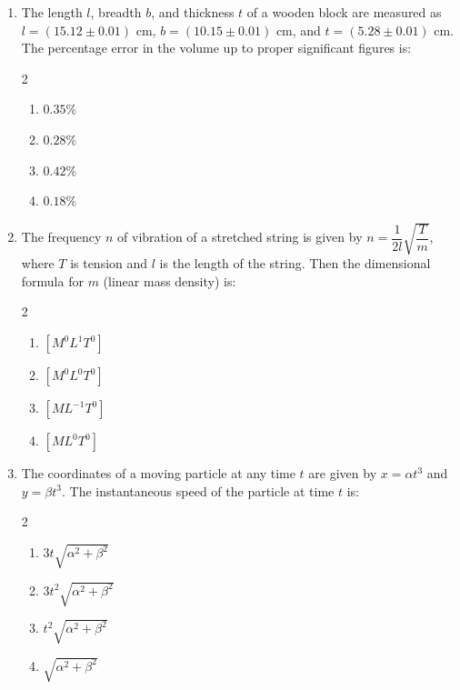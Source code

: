 \documentclass[11pt,a4paper]{article}
\begin{document}
\begin{enumerate}[label=\textbf{\textcolor{l1Green}{Q\arabic*.}},leftmargin=24pt,itemsep=10pt]
  \item The length $l$, breadth $b$, and thickness $t$ of a wooden block are measured as $l = (15.12 \pm 0.01)\text{ cm}$, $b = (10.15 \pm 0.01)\text{ cm}$, and $t = (5.28 \pm 0.01)\text{ cm}$. The percentage error in the volume up to proper significant figures is:
  \begin{multicols}{2}
  \begin{enumerate}[label=\textbf{\textcolor{primaryDark}{(\Alph*)}},itemsep=2pt]
    \item $0.35\%$
    \item $0.28\%$
    \item $0.42\%$
    \item $0.18\%$
  \end{enumerate}
  \end{multicols}

  \item The frequency $n$ of vibration of a stretched string is given by $n = \dfrac{1}{2l}\sqrt{\dfrac{T}{m}}$, where $T$ is tension and $l$ is the length of the string. Then the dimensional formula for $m$ (linear mass density) is:
  \begin{multicols}{2}
  \begin{enumerate}[label=\textbf{\textcolor{primaryDark}{(\Alph*)}},itemsep=2pt]
    \item $[M^0 L^1 T^0]$
    \item $[M^0 L^0 T^0]$
    \item $[M L^{-1} T^0]$
    \item $[M L^0 T^0]$
  \end{enumerate}
  \end{multicols}

  \item The coordinates of a moving particle at any time $t$ are given by $x = \alpha t^3$ and $y = \beta t^3$. The instantaneous speed of the particle at time $t$ is:
  \begin{multicols}{2}
  \begin{enumerate}[label=\textbf{\textcolor{primaryDark}{(\Alph*)}},itemsep=2pt]
    \item $3t \sqrt{\alpha^2 + \beta^2}$
    \item $3t^2 \sqrt{\alpha^2 + \beta^2}$
    \item $t^2 \sqrt{\alpha^2 + \beta^2}$
    \item $\sqrt{\alpha^2 + \beta^2}$
  \end{enumerate}
  \end{multicols}


\end{enumerate}
\end{document}
